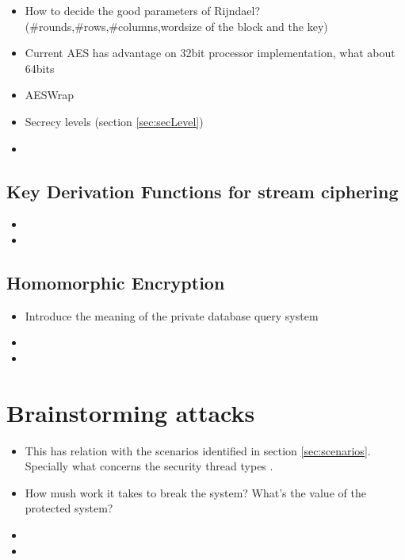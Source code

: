 \documentclass[10pt,a4paper,twoside]{llncs}
\begin{document}
\begin{itemize}
 \item How to decide the good parameters of Rijndael? (\#rounds,\#rows,\#columns,wordsize of the block and the key) \cite{gRijndael}
 \item Current AES has advantage on 32bit processor implementation, what about 64bits
 \item AESWrap \cite{rfc3394}
 \item Secrecy levels (section \ref{sec:secLevel})
 \item 
\end{itemize}

%
\subsection{Key Derivation Functions for stream ciphering \label{sec:kdfStreaming}}

\begin{itemize}
 \item 
 \item 
\end{itemize}

%
\subsection{Homomorphic Encryption \label{sec:Homorph}}
\begin{itemize}
 \item Introduce the meaning of the private database query system \cite{iacr422}
 \item 
 \item 
\end{itemize}

%
\section{Brainstorming attacks \label{sec:attacks}}

\begin{itemize}
 \item This has relation with the scenarios identified in section \ref{sec:scenarios}. Specially what concerns the security thread types \cite{SecEngRossAnderson}.
 \item How mush work it takes to break the system? What's the value of the protected system?
 \item 
 \item
\end{itemize}
\end{document}
